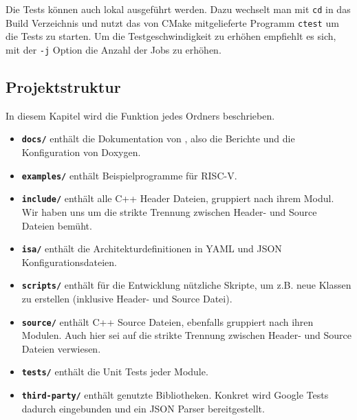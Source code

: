 Die Tests können auch lokal ausgeführt werden. Dazu wechselt man mit \texttt{cd} in das Build
Verzeichnis und nutzt das von CMake mitgelieferte Programm \texttt{ctest} um die Tests zu starten.
Um die Testgeschwindigkeit zu erhöhen empfiehlt es sich, mit der \texttt{-j} Option die Anzahl
der Jobs zu erhöhen.

\subsection{Projektstruktur}

In diesem Kapitel wird die Funktion jedes Ordners beschrieben.

\begin{itemize}
	\item \textbf{\texttt{docs/}} enthält die Dokumentation von \erasim, also
	die Berichte und die Konfiguration von Doxygen.
	\item \textbf{\texttt{examples/}} enthält Beispielprogramme für RISC-V.
	\item \textbf{\texttt{include/}} enthält alle C++ Header Dateien, gruppiert
	nach ihrem Modul. Wir haben uns um die strikte Trennung zwischen Header- und
	Source Dateien bemüht.
	\item \textbf{\texttt{isa/}} enthält die Architekturdefinitionen in YAML und
	JSON Konfigurationsdateien.
	\item \textbf{\texttt{scripts/}} enthält für die Entwicklung nützliche
	Skripte, um z.B. neue Klassen zu erstellen (inklusive Header- und
	Source Datei).
	\item \textbf{\texttt{source/}} enthält C++ Source Dateien, ebenfalls
	gruppiert nach ihren Modulen. Auch hier sei auf die strikte Trennung
	zwischen Header- und Source Dateien verwiesen.
	\item \textbf{\texttt{tests/}} enthält die Unit Tests jeder Module.
	\item \textbf{\texttt{third-party/}} enthält genutzte Bibliotheken. Konkret
	wird Google Tests dadurch eingebunden und ein JSON Parser bereitgestellt.
\end{itemize}